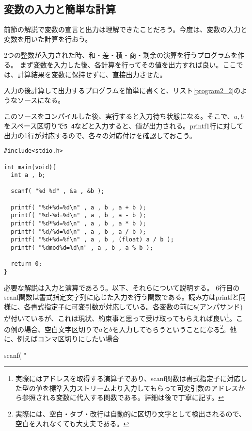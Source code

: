 \subsection{変数の入力と簡単な計算}
前節の解説で変数の宣言と出力は理解できたことだろう。今度は、変数の入力と変数を用いた計算を行おう。
\begin{boxnote}
2つの整数が入力された時、和・差・積・商・剰余の演算を行うプログラムを作る。
まず変数を入力した後、各計算を行ってその値を出力すれば良い。ここでは、計算結果を変数に保持せずに、直接出力させた。

入力の後計算して出力するプログラムを簡単に書くと、リスト\ref{program2_2}のようなソースになる。
\end{boxnote}
\begin{boxnote}
このソースをコンパイルした後、実行すると入力待ち状態になる。そこで、$a,b$をスペース区切りで\verb|5 4|などと入力すると、値が出力される。printf1行に対して出力の1行が対応するので、各々の対応付けを確認しておこう。
\begin{lstlisting}[caption=変数の四則演算,label=program2_2]
#include<stdio.h>

int main(void){
  int a , b;

  scanf( "%d %d" , &a , &b );

  printf( "%d+%d=%d\n" , a , b , a + b );
  printf( "%d-%d=%d\n" , a , b , a - b );
  printf( "%d*%d=%d\n" , a , b , a * b );
  printf( "%d/%d=%d\n" , a , b , a / b );
  printf( "%d+%d=%f\n" , a , b , (float) a / b );
  printf( "%dmod%d=%d\n" , a , b , a % b );

  return 0;
}
\end{lstlisting}
\end{boxnote}
必要な解説は入力と演算であろう。以下、それらについて説明する。
6行目のscanf関数は書式指定文字列に応じた入力を行う関数である。読み方はprintfと同様に、各書式指定子に可変引数が対応している。各変数の前に\verb|&|(アンパサンド)が付いているが、これは現状、約束事と思って受け取ってもらえれば良い\footnote{実際にはアドレスを取得する演算子であり、scanf関数は書式指定子に対応した型の値を標準入力ストリームより入力してもらって可変引数のアドレスから参照される変数に代入する関数である。詳細は後で丁寧に記す。}。この例の場合、空白文字区切りで$a$と$b$を入力してもらうということになる\footnote{実際には、空白・タブ・改行は自動的に区切り文字として検出されるので、空白を入れなくても大丈夫である。}。他に、例えばコンマ区切りにしたい場合
\begin{code}
scanf( "%
\end{code}
